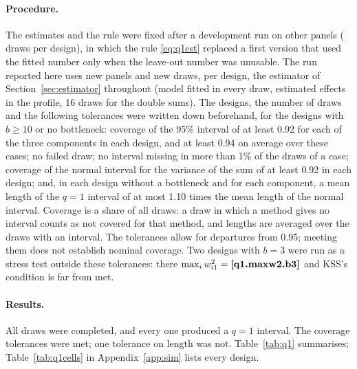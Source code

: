 \paragraph{Procedure.} The estimates and the rule were fixed after a development run on other panels
( draws per design), in which the rule \eqref{eq:q1est} replaced a first version that used the
fitted number only when the leave-out number was unusable. The run reported here uses new panels and new draws,
 per design, the estimator of Section~\ref{sec:estimator} throughout (model fitted in every draw,
estimated effects in the profile, 16 draws for the double sums). The designs, the number of draws and the
following tolerances were written down beforehand, for the  designs with $b\ge10$ or no
bottleneck: coverage of the 95\% interval of at least 0.92 for each of the three components in each design, and
at least 0.94 on average over these  cases; no failed draw; no interval missing in more than 1\% of
the draws of a case; coverage of the normal interval for the variance of the sum of at least 0.92 in each
design; and, in each design without a bottleneck and for each component, a mean length of the $q=1$ interval
of at most 1.10 times the mean length of the normal interval. Coverage is a share of all draws: a draw in
which a method gives no interval counts as not covered for that method, and lengths are averaged over the
draws with an interval. The tolerances allow for departures from 0.95; meeting them does not establish nominal
coverage. Two designs with $b=3$ were run as a stress test outside these tolerances: there
$\max_iw_{i1}^2=\R{q1.maxw2.b3}$ and KSS's condition is far from met.

\paragraph{Results.} All  draws were completed, and every one produced a $q=1$ interval. The
coverage tolerances were met; one tolerance on length was not. Table~\ref{tab:q1} summarises;
Table~\ref{tab:q1cells} in Appendix~\ref{app:sim} lists every design.


